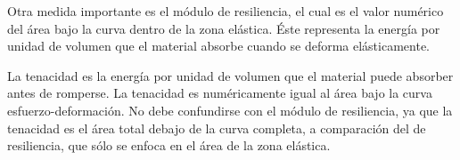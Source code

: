 \documentclass[12pt, letterpaper]{article}
\begin{document}
Otra medida importante es el módulo de resiliencia, el cual es el valor numérico del área bajo la curva dentro de la zona elástica. Éste representa la energía por unidad de volumen que el material absorbe cuando se deforma elásticamente.

La tenacidad es la energía por unidad de volumen que el material puede absorber antes de romperse. La tenacidad es numéricamente igual al área bajo la curva esfuerzo-deformación. No debe confundirse con el módulo de resiliencia, ya que la tenacidad es el área total debajo de la curva completa, a comparación del de resiliencia, que sólo se enfoca en el área de la zona elástica.
\renewcommand\refname{References}
\printbibliography
\end{document}
